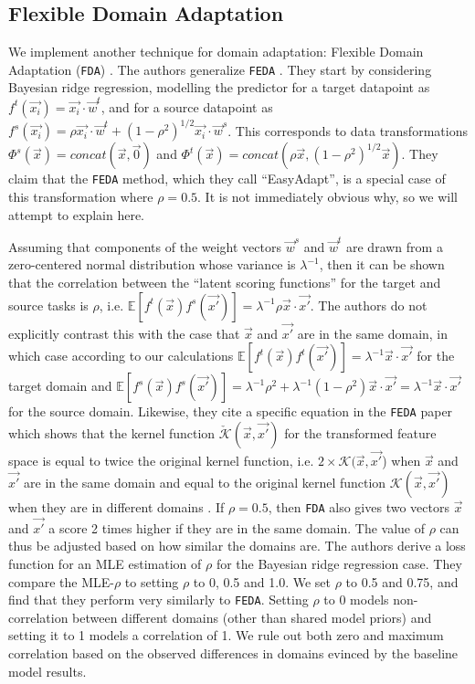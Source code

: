 \documentclass{article}
\begin{document}
\subsection{Flexible Domain Adaptation}

We implement another technique for domain adaptation: Flexible Domain Adaptation (\texttt{FDA}) \citep{easiest}. The authors generalize \texttt{FEDA} \citep{daume}. They start by considering Bayesian ridge regression, modelling the predictor for a target datapoint as \(f^t(\vec{x_i}) = \vec{x_i} \cdot \vec{w}^t\), and for a source datapoint as \(f^s(\vec{x_i}) = \rho \vec{x_i} \cdot \vec{w}^t + (1 - \rho^2)^{1/2}\vec{x_i} \cdot \vec{w}^s\). This corresponds to data transformations \(\Phi^s(\vec{x}) = concat(\vec{x}, \vec{0}) \) and \(\Phi^t(\vec{x}) = concat(\rho\vec{x}, (1 - \rho^2)^{1/2}\vec{x})\). They claim that the \texttt{FEDA} method, which they call ``EasyAdapt'', is a special case of this transformation where \(\rho = 0.5\). It is not immediately obvious why, so we will attempt to explain here.

Assuming that components of the weight vectors \(\vec{w}^s\) and \(\vec{w}^t\) are drawn from a zero-centered normal distribution whose variance is \(\lambda^{-1}\), then it can be shown that the correlation between the ``latent scoring functions'' for the target and source tasks is \(\rho\), i.e. \(\mathbb{E}[f^t(\vec{x})f^s(\vec{x'})] = \lambda^{-1}\rho \vec{x} \cdot \vec{x'}\). The authors do not explicitly contrast this with the case that \(\vec{x}\) and \(\vec{x'}\) are in the same domain, in which case according to our calculations \(\mathbb{E}[f^t(\vec{x})f^t(\vec{x'})] = \lambda^{-1} \vec{x} \cdot \vec{x'}\) for the target domain and \(\mathbb{E}[f^s(\vec{x})f^s(\vec{x'})] = \lambda^{-1}\rho^2 + \lambda^{-1} (1 - \rho^2)\vec{x} \cdot \vec{x'} = \lambda^{-1}\vec{x}\cdot\vec{x'}\) for the source domain. Likewise, they cite a specific equation in the \texttt{FEDA} paper which shows that the kernel function \(\check{\mathcal{K}}(\vec{x}, \vec{x'})\) for the transformed feature space is equal to twice the original kernel function, i.e. \(2 \times \mathcal{K}(\vec{x}, \vec{x'}\)) when \(\vec{x}\) and \(\vec{x'}\) are in the same domain and equal to the original kernel function \(\mathcal{K}(\vec{x}, \vec{x'})\) when they are in different domains \cite{easiest} \cite{daume}. If \(\rho = 0.5\), then \texttt{FDA} also gives two vectors \(\vec{x}\) and \(\vec{x'}\) a score 2 times higher if they are in the same domain. The value of \(\rho\) can thus be adjusted based on how similar the domains are. The authors derive a loss function for an MLE estimation of \(\rho\) for the Bayesian ridge regression case. They compare the MLE-\(\rho\) to setting \(\rho\) to 0, 0.5 and 1.0. We set \(\rho\) to 0.5 and 0.75,  and find that they perform very similarly to \texttt{FEDA}. Setting \(\rho\) to 0 models non-correlation between different domains (other than shared model priors) and setting it to 1 models a correlation of 1. We rule out both zero and maximum correlation based on the observed differences in domains evinced by the baseline model results.
\end{document}
